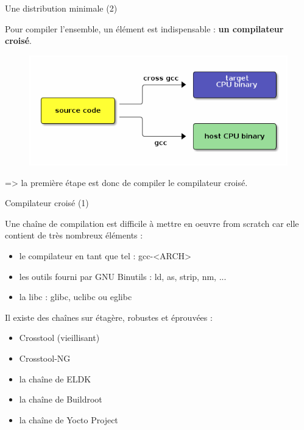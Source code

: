 \documentclass[12pt, t]{beamer}
\newcommand{\bi}{\begin{itemize}}
\newcommand{\ei}{\end{itemize}}
\begin{document}
\begin{frame}{Une distribution minimale (2)}

    \vspace{15pt}
    Pour compiler l'ensemble, un élément est indispensable : {\textbf{un
    compilateur croisé}}.

    {
        \begin{figure}
            \centering
            \includegraphics[scale=0.5]{cross_compile.png}
        \end{figure}
    }

    {
        \vspace{5pt}
        => la première étape est donc de compiler le compilateur croisé.
    }
\end{frame}

\begin{frame}{Compilateur croisé (1)}

    \vspace{10pt}
    Une chaîne de compilation est difficile à mettre en oeuvre from scratch car
    elle contient de très nombreux éléments :

    \bi
    \itemsep6pt
    \item le compilateur en tant que tel : gcc-<ARCH>
    \item les outils fourni par GNU Binutils : ld, as, strip, nm, ...
    \item la libc : glibc, uclibc ou eglibc
    \ei

    {
        \vspace{10pt}
        Il existe des chaînes sur étagère, robustes et éprouvées :
        \bi
        \itemsep6pt
        \item Crosstool (vieillisant)
        \item Crosstool-NG
        \item la chaîne de ELDK
        \item la chaîne de Buildroot
        \item la chaîne de Yocto Project
        \ei
    } 

\end{frame}
\end{document}
